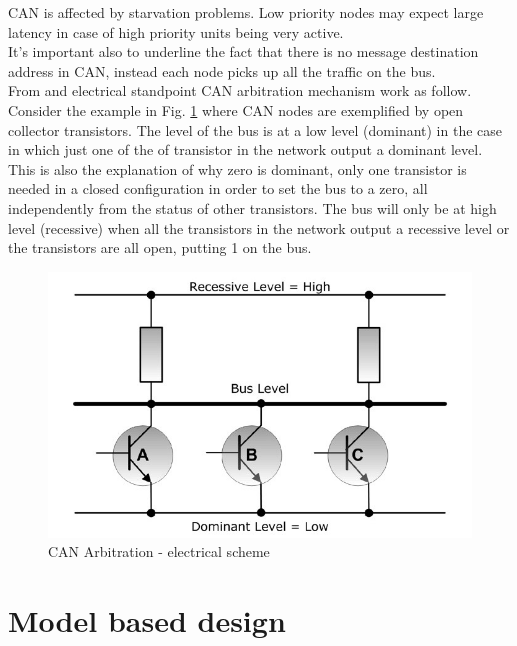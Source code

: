 \documentclass[../main.tex]{subfiles}
\begin{document}
\gls{CAN} is affected by starvation problems. Low priority nodes may expect large latency in case of high priority units being very active. \\
It's important also to underline the fact that there is no message destination address in \gls{CAN}, instead each node picks up all the traffic on the bus.\\
From and electrical standpoint \gls{CAN} arbitration mechanism work as follow. Consider the example in Fig. \ref{fig:CANABRELT} where \gls{CAN} nodes are exemplified by open collector transistors. 
The level of the bus is at a low level (dominant) in the case in which just one of the of transistor in the network output a dominant level. This is also the explanation of why zero is dominant, only one transistor is needed in a closed configuration in order to set the \gls{bus} to a zero, all independently from the status of other transistors. The \gls{bus} will only be at high level (recessive) when all the transistors in the network output a recessive level or the transistors are all open, putting 1 on the \gls{bus}.
\begin{figure}[ht]
    \centering
    \includegraphics[width=0.7\linewidth]{images_folder/controller-area-network-can-bus-bus-arbitration-3.jpg}
    \caption{CAN Arbitration -  electrical scheme}
    \label{fig:CANABRELT}
\end{figure}

\section{Model based design}
\end{document}
